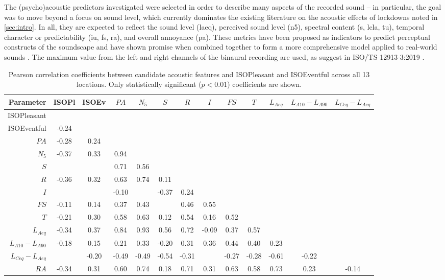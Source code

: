    The (psycho)acoustic predictors investigated were selected in order to describe many aspects of the recorded sound -- in particular, the goal was to move beyond a focus on sound level, which currently dominates the existing literature on the acoustic effects of lockdowns noted in \ref{sec:intro}. In all, they are expected to reflect the sound level (\gls{laeq}), perceived sound level (\gls{n5}), spectral content (\gls{s}, \gls{lcla}, \gls{tu}), temporal character or predictability (\gls{iu}, \gls{fs}, \gls{ra}), and overall annoyance (\gls{pa}). These metrics have been proposed as indicators to predict perceptual constructs of the soundscape \citep{Aletta2017Dimensions, Aletta2016Soundscape} and have shown promise when combined together to form a more comprehensive model applied to real-world sounds \citep{Orga2021Multilevel}. The maximum value from the left and right channels of the binaural recording are used, as suggest in ISO/TS 12913-3:2019 \citep{ISO12913Part3}.



\begin{table}
\centering
\caption{Pearson correlation coefficients between candidate acoustic features and ISOPleasant and ISOEventful across all 13 locations. Only statistically significant ($p < 0.01$) coefficients are shown. \label{tab:corr}}
\begin{tabular}{r|cccccccccccc} 
\toprule
\textbf{Parameter} & ISOPl & ISOEv & $PA$ & $N_5$ & $S$ & $R$ & $I$ & $FS$ & $T$ & $L_{Aeq}$ & $L_{A10}-L_{A90}$ & $L_{Ceq}-L_{Aeq}$ \\ 
\midrule
ISOPleasant &  &  &  &  &  &  &  &  &  &  &  &  \\
ISOEventful & -0.24 &  &  &  &  &  &  &  &  &  &  &  \\
$PA$ & -0.28 & 0.24 &  &  &  &  &  &  &  &  &  &  \\
$N_5$ & -0.37 & 0.33 & 0.94 &  &  &  &  &  &  &  &  &  \\
$S$ &  &  & 0.71 & 0.56 &  &  &  &  &  &  &  &  \\
$R$ & -0.36 & 0.32 & 0.63 & 0.74 & 0.11 &  &  &  &  &  &  &  \\
$I$ &  &  & -0.10 &  & -0.37 & 0.24 &  &  &  &  &  &  \\
$FS$ & -0.11 & 0.14 & 0.37 & 0.43 &  & 0.46 & 0.55 &  &  &  &  &  \\
$T$ & -0.21 & 0.30 & 0.58 & 0.63 & 0.12 & 0.54 & 0.16 & 0.52 &  &  &  &  \\
$L_{Aeq}$ & -0.34 & 0.37 & 0.84 & 0.93 & 0.56 & 0.72 & -0.09 & 0.37 & 0.57 &  &  &  \\
$L_{A10}-L_{A90}$ & -0.18 & 0.15 & 0.21 & 0.33 & -0.20 & 0.31 & 0.36 & 0.44 & 0.40 & 0.23 &  &  \\
$L_{Ceq}-L_{Aeq}$ &  & -0.20 & -0.49 & -0.49 & -0.54 & -0.31 &  & -0.27 & -0.28 & -0.61 & -0.22 &  \\
$RA$ & -0.34 & 0.31 & 0.60 & 0.74 & 0.18 & 0.71 & 0.31 & 0.63 & 0.58 & 0.73 & 0.23 & -0.14 \\
\bottomrule
\end{tabular}
\end{table}


